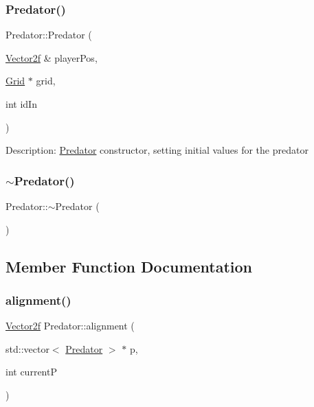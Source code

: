 \subsubsection{\texorpdfstring{Predator()}{Predator()}}
{\footnotesize\ttfamily Predator\+::\+Predator (\begin{DoxyParamCaption}\item[{\mbox{\hyperlink{class_vector2f}{Vector2f}} \&}]{player\+Pos,  }\item[{\mbox{\hyperlink{class_grid}{Grid}} $\ast$}]{grid,  }\item[{int}]{id\+In }\end{DoxyParamCaption})}

Description\+: \mbox{\hyperlink{class_predator}{Predator}} constructor, setting initial values for the predator \mbox{\label{class_predator_a9ef1a4a3a5988d1d1e5844a235b36b8b}} 
\subsubsection{\texorpdfstring{$\sim$Predator()}{~Predator()}}
{\footnotesize\ttfamily Predator\+::$\sim$\+Predator (\begin{DoxyParamCaption}{ }\end{DoxyParamCaption})}



\subsection{Member Function Documentation}
\mbox{\label{class_predator_afd1be3bbb0b2be00076c938488aafc04}} 
\subsubsection{\texorpdfstring{alignment()}{alignment()}}
{\footnotesize\ttfamily \mbox{\hyperlink{class_vector2f}{Vector2f}} Predator\+::alignment (\begin{DoxyParamCaption}\item[{std\+::vector$<$ \mbox{\hyperlink{class_predator}{Predator}} $>$ $\ast$}]{p,  }\item[{int}]{currentP }\end{DoxyParamCaption})}

